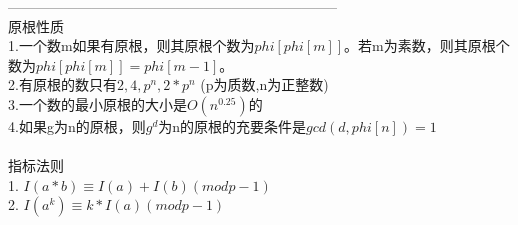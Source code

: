 ﻿-----------------------------------------------------------------------\\
原根性质\\
1.一个数m如果有原根，则其原根个数为$phi[phi[m]]$。若m为素数，则其原根个数为$phi[phi[m]]=phi[m-1]$。\\
2.有原根的数只有$2,4,p^n,2*p^n$ (p为质数,n为正整数)\\
3.一个数的最小原根的大小是$O(n^{0.25})$的\\
4.如果g为n的原根，则$g^d$为n的原根的充要条件是$gcd(d,phi[n])=1$\\
\\
指标法则\\
1. $I(a*b)≡I(a)+I(b) (mod p-1)$\\
2. $I(a^k)≡k*I(a) (mod p-1)$
